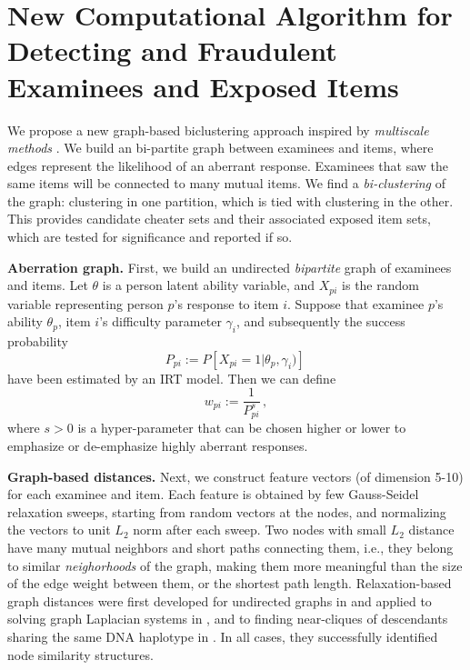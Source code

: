 \documentclass{article}
\begin{document}
\section{New Computational Algorithm for Detecting  and Fraudulent Examinees and Exposed Items}
We propose a new graph-based biclustering approach inspired by {\it multiscale methods} \cite{mg_guide}. We build an bi-partite graph between examinees and items, where edges represent the likelihood of an aberrant response. Examinees that saw the same items will be connected to many mutual items. We find a {\it bi-clustering} of the graph: clustering in one partition, which is tied with clustering in the other. This provides candidate cheater sets and their associated exposed item sets, which are tested for significance and reported if so.

{\bf Aberration graph.} First, we build an undirected {\it bipartite} graph of examinees and items. Let $\theta$ is a person latent ability variable, and $X_{pi}$ is the random variable representing person $p$'s response to item $i$. Suppose that examinee $p$'s ability $\theta_p$, item $i$'s difficulty parameter $\gamma_i$, and subsequently the success probability
\begin{equation}
	P_{pi} := P \left [X_{pi}=1 | \theta_p, \gamma_i) \right]\,
	\label{ppi} 
\end{equation}
have been estimated by an IRT model. Then we can define
\begin{equation}
  w_{pi} := \frac{1}{P_{pi}^s} \,,
  \label{weight}
\end{equation}
where $s  > 0$ is a hyper-parameter that can be chosen higher or lower to emphasize or de-emphasize highly aberrant responses.

{\bf Graph-based distances.} Next, we construct feature vectors (of dimension 5-10) for each examinee and item. Each feature is obtained by few Gauss-Seidel relaxation sweeps, starting from random vectors  at the nodes, and normalizing the vectors to unit $L_2$ norm after each sweep. Two nodes with small $L_2$ distance have many mutual neighbors and short paths connecting them, i.e., they belong to similar {\it neighorhoods} of the graph, making them more meaningful than the size of the edge weight between them, or the shortest path length. Relaxation-based graph distances were first developed for undirected graphs in \cite{safro} and applied to solving graph Laplacian systems in \cite{lamg}, and to finding near-cliques of descendants sharing the same DNA haplotype in \cite{primal}. In all cases, they successfully identified node similarity structures.
\end{document}
